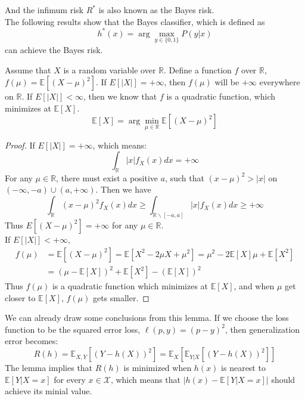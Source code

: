 \noindent And the infimum risk $R^*$ is also known as the Bayes risk.\\
The following results show that the Bayes classifier, which is defined as 
\begin{equation}
h^*(x)=\arg\max_{y\in \{0,1\}}P(y|x)
\end{equation}
can achieve the Bayes risk.

\begin{lemma}
	Assume that $X$ is a random variable over $\mathbb{R}$. Define a function $f$ over $\mathbb{R}$, $f(\mu)= \mathbb{E}[(X-\mu)^2]$. If $E[|X|]=+\infty$, then $f(\mu)$ will be $+\infty$ everywhere on $\mathbb{R}$. If $E[|X|]<\infty$, then we know that $f$ is a quadratic function, which minimizes at $\mathbb{E}[X]$.
	$$\mathbb{E}[X]= \arg\min_{\mu \in \mathbb{R}} \mathbb{E}[(X-\mu)^2] $$
\end{lemma}
\begin{proof}
	If $E[|X|]=+\infty$, which means:
	\begin{equation}
	\int_{\mathbb{R}} |x|f_{X}(x) dx =+\infty
	\end{equation}
	For any $\mu \in \mathbb{R}$, there must exist a positive $a$, such that $(x-\mu)^2>|x|$ on $(-\infty,-a)\cup (a,+\infty)$. Then we have
	\begin{equation}
	\int_{\mathbb{R}} (x-\mu)^2f_{X}(x) dx \geq \int_{\mathbb{R}\backslash[-a,a]} |x|f_{X}(x) dx \geq +\infty
	\end{equation}
	Thus $E[(X-\mu)^2]=+\infty$ for any $\mu \in \mathbb{R}$.\\
	
	\noindent If $E[|X|]<+\infty$,
	\begin{align}
	f(\mu)&= \mathbb{E}[(X-\mu)^2]= \mathbb{E}[X^2-2\mu X+\mu^2]= \mu^2 -2\mathbb{E}[X]\mu +\mathbb{E}[X^2]\\
	&=(\mu -\mathbb{E}[X])^2 + \mathbb{E}[X^2] - (\mathbb{E}[X])^2
	\end{align}
	Thus $f(\mu)$ is a quadratic function which minimizes at $\mathbb{E}[X]$, and when $\mu$ get closer to $\mathbb{E}[X]$, $f(\mu)$ gets smaller.
\end{proof}

We can already draw some conclusions from this lemma. If we choose the loss function to be the squared error loss, $\ell(p,y)=(p-y)^2$, then generalization error becomes:
\begin{equation}
R(h)= \mathbb{E}_{X,Y}[(Y-h(X))^2] = \mathbb{E}_{X}[\mathbb{E}_{Y|X}[(Y-h(X))^2]]
\end{equation}
The lemma implies that $R(h)$ is minimized when $h(x)$ is nearest to $\mathbb{E}[Y|X=x]$ for every $x\in \mathcal{X}$, which means that $\big|h(x)-\mathbb{E}[Y|X=x]\big|$ should achieve its minial value.\\

